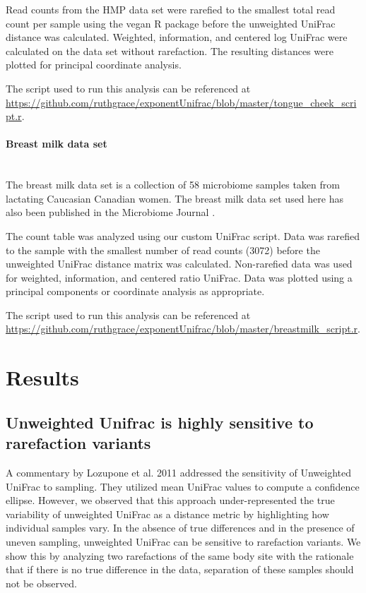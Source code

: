 \documentclass[10pt,letterpaper]{article}
\begin{document}
Read counts from the HMP data set were rarefied to the smallest total read count per sample using the vegan R package \cite{oksanen2007vegan} before the unweighted UniFrac distance was calculated. Weighted, information, and centered log UniFrac were calculated on the data set without rarefaction. The resulting distances were plotted for principal coordinate analysis.

The script used to run this analysis can be referenced at \url{https://github.com/ruthgrace/exponentUnifrac/blob/master/tongue_cheek_script.r}.

\paragraph{Breast milk data set}\mbox{}\\
The breast milk data set is a collection of 58 microbiome samples taken from lactating Caucasian Canadian women. The breast milk data set used here has also been published in the Microbiome Journal \cite{urbaniak2016human}.

The count table was analyzed using our custom UniFrac script. Data was rarefied to the sample with the smallest number of read counts (3072) before the unweighted UniFrac distance matrix was calculated. Non-rarefied data was used for weighted, information, and centered ratio UniFrac. Data was plotted using a principal components or coordinate analysis as appropriate.

The script used to run this analysis can be referenced at \url{https://github.com/ruthgrace/exponentUnifrac/blob/master/breastmilk_script.r}.

\section*{Results}

\subsection{Unweighted Unifrac is highly sensitive to rarefaction variants}

A commentary by Lozupone et al. 2011 \cite{lozupone2011unifrac} addressed the sensitivity of Unweighted UniFrac to sampling. They utilized mean UniFrac values to compute a confidence ellipse. However, we observed that this approach under-represented the true variability of unweighted UniFrac as a distance metric by highlighting how individual samples vary. In the absence of true differences and in the presence of uneven sampling, unweighted UniFrac can be sensitive to rarefaction variants. We show this by analyzing two rarefactions of the same body site with the rationale that if there is no true difference in the data, separation of these samples should not be observed.
\end{document}
